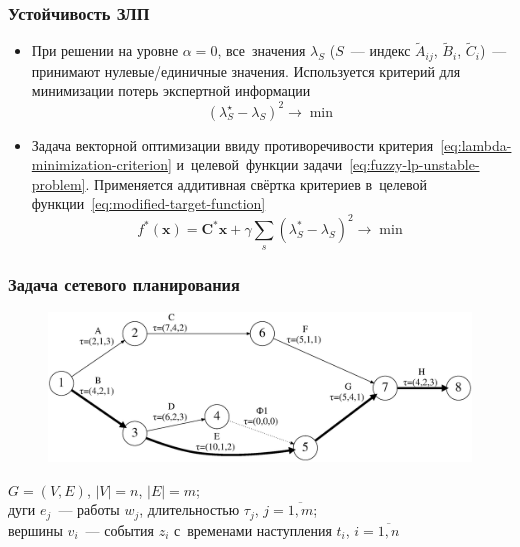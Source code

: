\documentclass[12pt]{beamer}
\begin{document}
\begin{frame}
  \frametitle{Устойчивость ЗЛП}
  \begin{itemize}
    \item При решении на уровне $\alpha=0$, все~значения $\lambda_S$ ($S$~--- индекс $\tilde A_{ij}$, $\tilde B_i$, $\tilde C_i$)~--- принимают нулевые/единичные значения. Используется критерий для минимизации потерь экспертной информации
      \begin{equation}
      \label{eq:lambda-minimization-criterion}
        {\left( \lambda_{S}^{\star}-\lambda_S \right)}^2\to \min
      \end{equation}
    
    \item Задача векторной оптимизации ввиду противоречивости критерия~\eqref{eq:lambda-minimization-criterion} и~целевой~функции задачи~\eqref{eq:fuzzy-lp-unstable-problem}. Применяется аддитивная свёртка критериев в~целевой функции~\eqref{eq:modified-target-function}
      \begin{equation}
      \label{eq:modified-target-function}
        f^{*}\left( \mathbf{x} \right)=\mathbf{C}^{*}\mathbf{x}+\gamma \sum\limits_{s}^{}{\left(\lambda_{S}^{*}-\lambda_S \right)}^{2} \to \min
      \end{equation}
  \end{itemize}
\end{frame}

\begin{frame}
  \frametitle{Задача сетевого планирования}
  \begin{figure}
    \center
    \includegraphics[width=\textwidth]{pplan}
  \end{figure}
  $G=(V,E)$, $\left| V \right|=n$, $\left| E \right|=m$; \\
  дуги $e_j$~--- работы $w_j$, длительностью $\tau_j$, $j=\overline{1,m}$; \\
  вершины $v_i$~--- события $z_i$ с~временами наступления $t_i$, $i=\overline{1,n}$
\end{frame}
\end{document}

